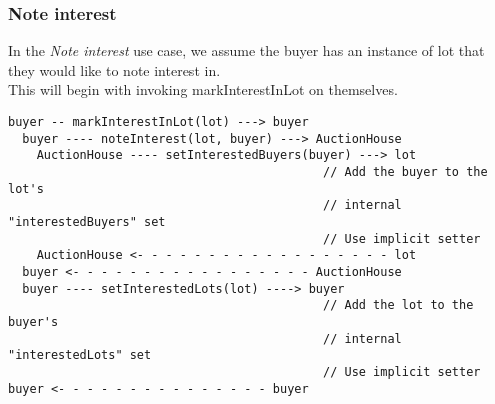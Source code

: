 \documentclass[titlepage, 12pt]{extarticle}
\begin{document}
\subsubsection{Note interest}
In the {\it Note interest} use case, we assume the buyer has an instance of lot that they would like to note interest in.\\
This will begin with invoking markInterestInLot on themselves.
\begin{verbatim}
buyer -- markInterestInLot(lot) ---> buyer
  buyer ---- noteInterest(lot, buyer) ---> AuctionHouse
    AuctionHouse ---- setInterestedBuyers(buyer) ---> lot
                                            // Add the buyer to the lot's
                                            // internal "interestedBuyers" set
                                            // Use implicit setter
    AuctionHouse <- - - - - - - - - - - - - - - - - - lot
  buyer <- - - - - - - - - - - - - - - - - AuctionHouse
  buyer ---- setInterestedLots(lot) ----> buyer 
                                            // Add the lot to the buyer's
                                            // internal "interestedLots" set
                                            // Use implicit setter
buyer <- - - - - - - - - - - - - - - buyer
\end{verbatim}
\newpage
\end{document}
